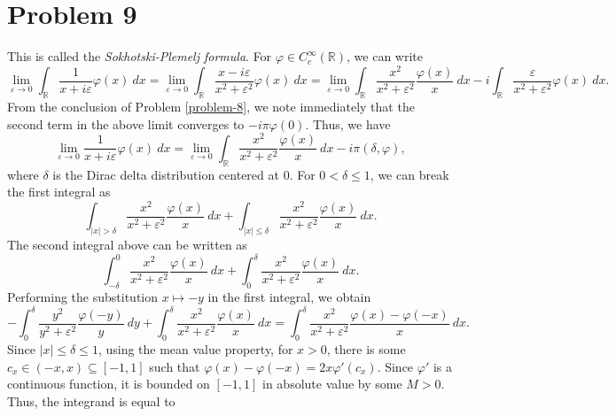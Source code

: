 \documentclass[10pt]{amsart}
\theoremstyle{thmstyle}
\theoremstyle{defstyle}
\newcommand{\R}{\mathbb{R}}
\renewcommand{\le}{\leqslant}
\begin{document}
\section{Problem 9}

This is called the \emph{Sokhotski-Plemelj formula}. For $\varphi\in C_c^\infty(\R)$, we can write 
\begin{equation*}
	\lim_{\varepsilon\to 0}\int_{\R}\frac{1}{x + i\varepsilon}\varphi(x)~dx = \lim_{\varepsilon\to 0}\int_{\R}\frac{x - i\varepsilon}{x^2 + \varepsilon^2}\varphi(x)~dx = \lim_{\varepsilon\to 0}\int_{\R}\frac{x^2}{x^2 + \varepsilon^2}\frac{\varphi(x)}{x}~dx - i\int_{\R}\frac{\varepsilon}{x^2 + \varepsilon^2}\varphi(x)~dx.
\end{equation*}
From the conclusion of Problem \ref{problem-8}, we note immediately that the second term in the above limit converges to $-i\pi\varphi(0)$. Thus, we have 
\begin{equation*}
	\lim_{\varepsilon\to 0}\frac{1}{x + i\varepsilon}\varphi(x)~dx = \lim_{\varepsilon\to 0}\int_{\R}\frac{x^2}{x^2 + \varepsilon^2}\frac{\varphi(x)}{x}~dx - i\pi(\delta,\varphi),
\end{equation*}
where $\delta$ is the Dirac delta distribution centered at $0$. For $0 < \delta\le 1$, we can break the first integral as 
\begin{equation*}
	\int_{|x| > \delta}\frac{x^2}{x^2 + \varepsilon^2}\frac{\varphi(x)}{x}~dx + \int_{|x|\le\delta}\frac{x^2}{x^2 + \varepsilon^2}\frac{\varphi(x)}{x}~dx.
\end{equation*}
The second integral above can be written as 
\begin{equation*}
	\int_{-\delta}^0\frac{x^2}{x^2 + \varepsilon^2}\frac{\varphi(x)}{x}~dx + \int_{0}^\delta\frac{x^2}{x^2 + \varepsilon^2}\frac{\varphi(x)}{x}~dx.
\end{equation*}
Performing the substitution $x\mapsto -y$ in the first integral, we obtain 
\begin{equation*}
	-\int_{0}^\delta\frac{y^2}{y^2 + \varepsilon^2}\frac{\varphi(-y)}{y}~dy + \int_{0}^\delta\frac{x^2}{x^2 + \varepsilon^2}\frac{\varphi(x)}{x}~dx = \int_{0}^\delta\frac{x^2}{x^2 + \varepsilon^2}\frac{\varphi(x) - \varphi(-x)}{x}~dx.
\end{equation*}
Since $|x|\le\delta\le 1$, using the mean value property, for $x > 0$, there is some $c_x\in (-x, x)\subseteq[-1, 1]$ such that $\varphi(x) - \varphi(-x) = 2x\varphi'(c_x)$. Since $\varphi'$ is a continuous function, it is bounded on $[-1, 1]$ in absolute value by some $M > 0$. Thus, the integrand is equal to 
\end{document}

